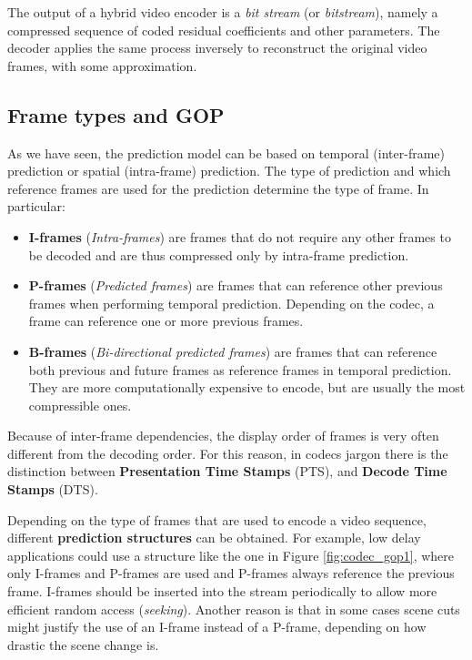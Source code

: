 The output of a hybrid video encoder is a \textit{bit stream} (or \textit{bitstream}), namely a compressed sequence of coded residual coefficients and other parameters. The decoder applies the same process inversely to reconstruct the original video frames, with some approximation.

\subsection{Frame types and GOP}
\label{sec:bg/compression/gop}

As we have seen, the prediction model can be based on temporal (inter-frame) prediction or spatial (intra-frame) prediction. The type of prediction and which reference frames are used for the prediction determine the type of frame. In particular:

\begin{itemize}
    \item \textbf{I-frames} (\textit{Intra-frames}) are frames that do not require any other frames to be decoded and are thus compressed only by intra-frame prediction.
    \item \textbf{P-frames} (\textit{Predicted frames}) are frames that can reference other previous frames when performing temporal prediction. Depending on the codec, a frame can reference one or more previous frames.
    \item \textbf{B-frames} (\textit{Bi-directional predicted frames}) are frames that can reference both previous and future frames as reference frames in temporal prediction. They are more computationally expensive to encode, but are usually the most compressible ones.
\end{itemize}

Because of inter-frame dependencies, the display order of frames is very often different from the decoding order. For this reason, in codecs jargon there is the distinction between \textbf{Presentation Time Stamps} (PTS), and \textbf{Decode Time Stamps} (DTS).

Depending on the type of frames that are used to encode a video sequence, different \textbf{prediction structures} can be obtained. For example, low delay applications could use a structure like the one in Figure \ref{fig:codec_gop1}, where only I-frames and P-frames are used and P-frames always reference the previous frame. I-frames should be inserted into the stream periodically to allow more efficient random access (\textit{seeking}). Another reason is that in some cases scene cuts might justify the use of an I-frame instead of a P-frame, depending on how drastic the scene change is.

